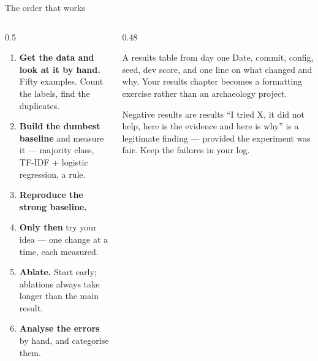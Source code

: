 \documentclass[aspectratio=169,11pt]{beamer}
\newcommand{\key}[1]{\textbf{\color{brand}#1}}
\begin{document}
\begin{frame}{The order that works}
\begin{columns}[T]
\begin{column}{0.5\textwidth}
\begin{enumerate}
  \item \key{Get the data and look at it by hand.} Fifty examples. Count the
        labels, find the duplicates.
  \item \key{Build the dumbest baseline} and measure it --- majority class,
        TF-IDF + logistic regression, a rule.
  \item \key{Reproduce the strong baseline.}
  \item \key{Only then} try your idea --- one change at a time, each measured.
  \item \key{Ablate.} Start early; ablations always take longer than the main
        result.
  \item \key{Analyse the errors} by hand, and categorise them.
\end{enumerate}
\end{column}
\begin{column}{0.48\textwidth}
\begin{block}{A results table from day one}
\footnotesize
Date, commit, config, seed, dev score, and one line on what changed and why.
Your results chapter becomes a formatting exercise rather than an archaeology
project.
\end{block}
\begin{block}{Negative results are results}
\footnotesize
``I tried X, it did not help, here is the evidence and here is why'' is a
legitimate finding --- provided the experiment was fair. Keep the failures in
your log.
\end{block}
\end{column}
\end{columns}
\end{frame}
\end{document}
